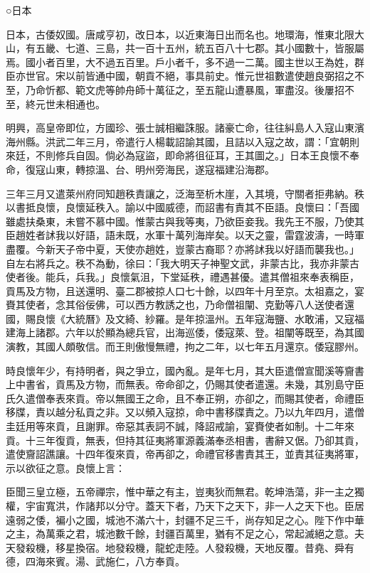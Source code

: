 
\begin{pinyinscope}
○日本

日本，古倭奴國。唐咸亨初，改日本，以近東海日出而名也。地環海，惟東北限大山，有五畿、七道、三島，共一百十五州，統五百八十七郡。其小國數十，皆服屬焉。國小者百里，大不過五百里。戶小者千，多不過一二萬。國主世以王為姓，群臣亦世官。宋以前皆通中國，朝貢不絕，事具前史。惟元世祖數遣使趙良弼招之不至，乃命忻都、範文虎等帥舟師十萬征之，至五龍山遭暴風，軍盡沒。後屢招不至，終元世未相通也。

明興，高皇帝即位，方國珍、張士誠相繼誅服。諸豪亡命，往往糾島人入寇山東濱海州縣。洪武二年三月，帝遣行人楊載詔諭其國，且詰以入寇之故，謂：「宜朝則來廷，不則修兵自固。倘必為寇盜，即命將徂征耳，王其圖之。」日本王良懷不奉命，復寇山東，轉掠溫、台、明州旁海民，遂寇福建沿海郡。

三年三月又遣萊州府同知趙秩責讓之，泛海至析木崖，入其境，守關者拒弗納。秩以書抵良懷，良懷延秩入。諭以中國威德，而詔書有責其不臣語。良懷曰：「吾國雖處扶桑東，未嘗不慕中國。惟蒙古與我等夷，乃欲臣妾我。我先王不服，乃使其臣趙姓者訹我以好語，語未既，水軍十萬列海岸矣。以天之靈，雷霆波濤，一時軍盡覆。今新天子帝中夏，天使亦趙姓，豈蒙古裔耶？亦將訹我以好語而襲我也。」自左右將兵之。秩不為動，徐曰：「我大明天子神聖文武，非蒙古比，我亦非蒙古使者後。能兵，兵我。」良懷氣沮，下堂延秩，禮遇甚優。遣其僧祖來奉表稱臣，貢馬及方物，且送還明、臺二郡被掠人口七十餘，以四年十月至京。太祖嘉之，宴賚其使者，念其俗佞佛，可以西方教誘之也，乃命僧祖闡、克勤等八人送使者還國，賜良懷《大統曆》及文綺、紗羅。是年掠溫州。五年寇海鹽、水敢浦，又寇福建海上諸郡。六年以於顯為總兵官，出海巡倭，倭寇萊、登。祖闡等既至，為其國演教，其國人頗敬信。而王則傲慢無禮，拘之二年，以七年五月還京。倭寇膠州。

時良懷年少，有持明者，與之爭立，國內亂。是年七月，其大臣遣僧宣聞溪等齎書上中書省，貢馬及方物，而無表。帝命卻之，仍賜其使者遣還。未幾，其別島守臣氏久遣僧奉表來貢。帝以無國王之命，且不奉正朔，亦卻之，而賜其使者，命禮臣移牒，責以越分私貢之非。又以頻入寇掠，命中書移牒責之。乃以九年四月，遣僧圭廷用等來貢，且謝罪。帝惡其表詞不誠，降詔戒諭，宴賚使者如制。十二年來貢。十三年復貢，無表，但持其征夷將軍源義滿奉丞相書，書辭又倨。乃卻其貢，遣使齎詔譙讓。十四年復來貢，帝再卻之，命禮官移書責其王，並責其征夷將軍，示以欲征之意。良懷上言：

臣聞三皇立極，五帝禪宗，惟中華之有主，豈夷狄而無君。乾坤浩蕩，非一主之獨權，宇宙寬洪，作諸邦以分守。蓋天下者，乃天下之天下，非一人之天下也。臣居遠弱之倭，褊小之國，城池不滿六十，封疆不足三千，尚存知足之心。陛下作中華之主，為萬乘之君，城池數千餘，封疆百萬里，猶有不足之心，常起滅絕之意。夫天發殺機，移星換宿。地發殺機，龍蛇走陸。人發殺機，天地反覆。昔堯、舜有德，四海來賓。湯、武施仁，八方奉貢。


\end{pinyinscope}
